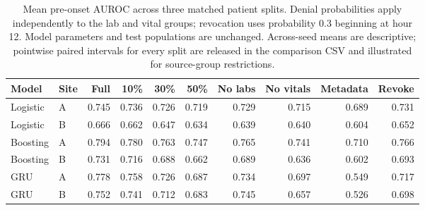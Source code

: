 \begin{table}[t]\centering\small\setlength{\tabcolsep}{4pt}
\caption{Mean pre-onset AUROC across three matched patient splits. Denial probabilities apply independently to the lab and vital groups; revocation uses probability 0.3 beginning at hour 12. Model parameters and test populations are unchanged. Across-seed means are descriptive; pointwise paired intervals for every split are released in the comparison CSV and illustrated for source-group restrictions.}
\begin{tabular}{llrrrrrrrr}\toprule
Model & Site & Full & 10\% & 30\% & 50\% & No labs & No vitals & Metadata & Revoke\\\midrule
Logistic & A & 0.745 & 0.736 & 0.726 & 0.719 & 0.729 & 0.715 & 0.689 & 0.731 \\
Logistic & B & 0.666 & 0.662 & 0.647 & 0.634 & 0.639 & 0.640 & 0.604 & 0.652 \\
Boosting & A & 0.794 & 0.780 & 0.763 & 0.747 & 0.765 & 0.741 & 0.710 & 0.766 \\
Boosting & B & 0.731 & 0.716 & 0.688 & 0.662 & 0.689 & 0.636 & 0.602 & 0.693 \\
GRU & A & 0.778 & 0.758 & 0.726 & 0.687 & 0.734 & 0.697 & 0.549 & 0.717 \\
GRU & B & 0.752 & 0.741 & 0.712 & 0.683 & 0.745 & 0.657 & 0.526 & 0.698 \\
\bottomrule\end{tabular}\end{table}
